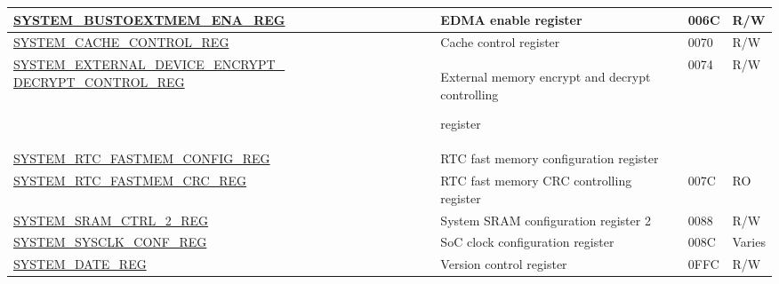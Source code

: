 \begin{longtable}{ | p{6.5cm} | p{7.5cm} | p{1.3cm} | p{1cm} | }
\hyperref[regdesc:SYSTEMBUSTOEXTMEMENAREG]{SYSTEM\_BUSTOEXTMEM\_ENA\_REG} & EDMA enable register & \hexprefix{}006C & R/W \\ \hline
\hyperref[regdesc:SYSTEMCACHECONTROLREG]{SYSTEM\_CACHE\_CONTROL\_REG} & Cache control register & \hexprefix{}0070 & R/W \\ \hline
\hyperref[regdesc:SYSTEMEXTERNALDEVICEENCRYPTDECRYPTCONTROLREG]{SYSTEM\_EXTERNAL\_DEVICE\_ENCRYPT\_}  \hyperref[regdesc:SYSTEMEXTERNALDEVICEENCRYPTDECRYPTCONTROLREG]{DECRYPT\_CONTROL\_REG}  & External memory encrypt and decrypt controlling

register & \multirow{2}{*}{\hexprefix{}0074}  & \multirow{2}{*}{R/W} \\ \hline
\hyperref[regdesc:SYSTEMRTCFASTMEMCONFIGREG]{SYSTEM\_RTC\_FASTMEM\_CONFIG\_REG} & RTC fast memory configuration register & \hexprefix{}0078 & Varies \\ \hline
\hyperref[regdesc:SYSTEMRTCFASTMEMCRCREG]{SYSTEM\_RTC\_FASTMEM\_CRC\_REG} & RTC fast memory CRC controlling register & \hexprefix{}007C & RO \\ \hline
\hyperref[regdesc:SYSTEMSRAMCTRL2REG]{SYSTEM\_SRAM\_CTRL\_2\_REG} & System SRAM configuration register 2 & \hexprefix{}0088 & R/W \\ \hline
\hyperref[regdesc:SYSTEMSYSCLKCONFREG]{SYSTEM\_SYSCLK\_CONF\_REG} & SoC clock configuration register & \hexprefix{}008C & Varies \\ \hline
\hyperref[regdesc:SYSTEMREGDATEREG]{SYSTEM_DATE\_REG} & Version control register & \hexprefix{}0FFC & R/W \\ \hline
\end{longtable}
